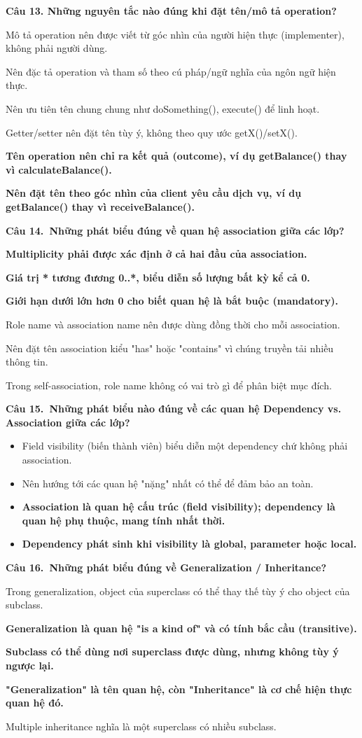 \documentclass[11pt,a4paper]{article}
\newcommand{\cau}[2]{\par\vspace{2pt}\noindent\textbf{Câu #1.\ #2}\par\vspace{1pt}}
\newenvironment{pa}
  {\begin{list}{}{\leftmargin=0.95cm\labelwidth=0.5cm\labelsep=0.3cm
     \itemsep=0pt\parsep=0pt\topsep=0pt\partopsep=0pt}}
  {\end{list}}
\newcommand{\A}{\item[A.]}
\newcommand{\B}{\item[B.]}
\newcommand{\C}{\item[C.]}
\newcommand{\D}{\item[D.]}
\newcommand{\E}{\item[E.]}
\newcommand{\F}{\item[F.]}
\begin{document}
\par\noindent\textbf{Câu 13. Những nguyên tắc nào đúng khi đặt tên/mô tả operation?}
\begin{pa}
  \A Mô tả operation nên được viết từ góc nhìn của người hiện thực (implementer), không phải người dùng.
  \B Nên đặc tả operation và tham số theo cú pháp/ngữ nghĩa của ngôn ngữ hiện thực.
  \C Nên ưu tiên tên chung chung như doSomething(), execute() để linh hoạt.
  \D Getter/setter nên đặt tên tùy ý, không theo quy ước getX()/setX().
  \E {\bfseries Tên operation nên chỉ ra kết quả (outcome), ví dụ getBalance() thay vì calculateBalance().}
  \F {\bfseries Nên đặt tên theo góc nhìn của client yêu cầu dịch vụ, ví dụ getBalance() thay vì receiveBalance().}
\end{pa}

\cau{14}{Những phát biểu đúng về quan hệ association giữa các lớp?}
\begin{pa}
  \A {\bfseries Multiplicity phải được xác định ở cả hai đầu của association.}
  \B {\bfseries Giá trị * tương đương 0..*, biểu diễn số lượng bất kỳ kể cả 0.}
  \C {\bfseries Giới hạn dưới lớn hơn 0 cho biết quan hệ là bắt buộc (mandatory).}
  \D Role name và association name nên được dùng đồng thời cho mỗi association.
  \E Nên đặt tên association kiểu "has" hoặc "contains" vì chúng truyền tải nhiều thông tin.
  \F Trong self-association, role name không có vai trò gì để phân biệt mục đích.
\end{pa}

\cau{15}{Những phát biểu nào đúng về các quan hệ Dependency vs. Association giữa các lớp?}
\begin{itemize}[leftmargin=0.95cm,labelwidth=0.5cm,labelsep=0.3cm,itemsep=0pt,parsep=0pt,topsep=0pt,partopsep=0pt]
  \item[A.] Field visibility (biến thành viên) biểu diễn một dependency chứ không phải association.
  \B Nên hướng tới các quan hệ "nặng" nhất có thể để đảm bảo an toàn.
  \C {\bfseries Association là quan hệ cấu trúc (field visibility); dependency là quan hệ phụ thuộc, mang tính nhất thời.}
  \D {\bfseries Dependency phát sinh khi visibility là global, parameter hoặc local.}
\end{itemize}

\cau{16}{Những phát biểu đúng về Generalization / Inheritance?}
\begin{pa}
  \A Trong generalization, object của superclass có thể thay thế tùy ý cho object của subclass.
  \B {\bfseries Generalization là quan hệ "is a kind of" và có tính bắc cầu (transitive).}
  \C {\bfseries Subclass có thể dùng nơi superclass được dùng, nhưng không tùy ý ngược lại.}
  \D {\bfseries "Generalization" là tên quan hệ, còn "Inheritance" là cơ chế hiện thực quan hệ đó.}
  \E Multiple inheritance nghĩa là một superclass có nhiều subclass.
\end{pa}
\end{document}
